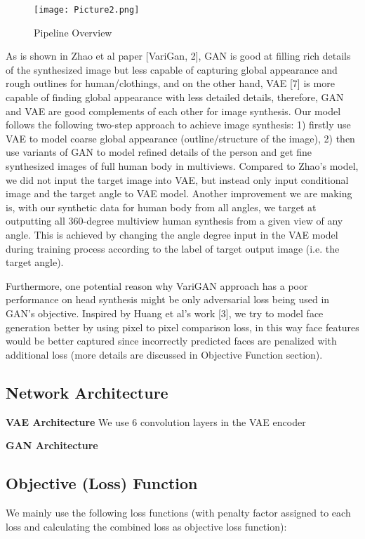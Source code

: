 \documentclass[10pt,conference]{IEEEtran}
\begin{document}
\begin{figure*}[htbp]
\centering
\texttt{[image: Picture2.png]}
\caption{Pipeline Overview}
\end{figure*}

As is shown in Zhao et al paper [VariGan, 2], GAN is good at filling rich details of the synthesized image but less capable of capturing global appearance and rough outlines for human/clothings, and on the other hand, VAE [7] is more capable of finding global appearance with less detailed details, therefore, GAN and VAE are good complements of each other for image synthesis. Our model follows the following two-step approach to achieve image synthesis: 1) firstly use VAE to model coarse global appearance (outline/structure of the image), 2) then use variants of GAN to model refined details of the person and get fine synthesized images of full human body in multiviews. Compared to Zhao's model, we did not input the target image into VAE, but instead only input conditional image and the target angle to VAE model. Another improvement we are making is, with our synthetic data for human body from all angles, we target at outputting all 360-degree multiview human synthesis from a given view of any angle. This is achieved by changing the angle degree input in the VAE model during training process according to the label of target output image (i.e. the target angle). 

Furthermore, one potential reason why VariGAN approach has a poor performance on head synthesis might be only adversarial loss being used in GAN's objective. Inspired by Huang et al's work [3], we try to model face generation better by using pixel to pixel comparison loss, in this way face features would be better captured since incorrectly predicted faces are penalized with additional loss (more details are discussed in Objective Function section).

\subsection{Network Architecture}
\textbf{VAE Architecture} 
We use 6 convolution layers in the VAE encoder 

\textbf{GAN Architecture} 


\subsection{Objective (Loss) Function}
We mainly use the following loss functions (with penalty factor assigned to each loss and calculating the combined loss as objective loss function):
\end{document}
